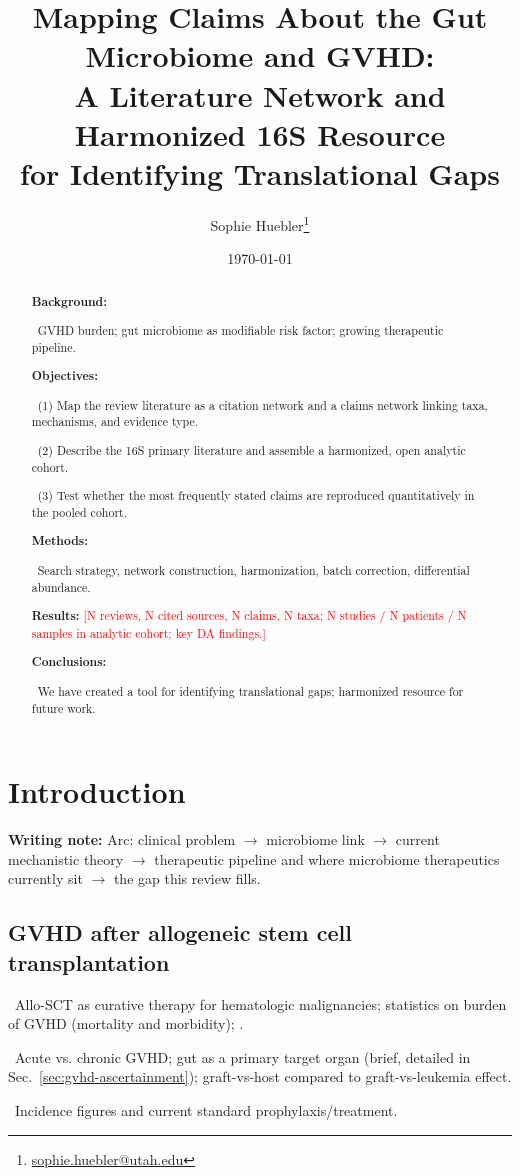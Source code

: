 \documentclass[11pt,a4paper]{article}
\newcommand{\todoitem}[1]{\par\noindent\textcolor{blue!70!black}{\textbullet~#1}}
\newcommand{\writingnote}[1]{\par\medskip\noindent\colorbox{yellow!30}{\parbox{\dimexpr\linewidth-2\fboxsep}{%
  \small\textbf{Writing note:} #1}}\par\medskip}
\newcommand{\ph}[1]{\textcolor{red}{[#1]}}  %
\begin{document}
\title{Mapping Claims About the Gut Microbiome and GVHD:\\
A Literature Network and Harmonized 16S Resource\\for Identifying Translational Gaps}
\author{Sophie Huebler\thanks{\href{mailto:sophie.huebler@utah.edu}{sophie.huebler@utah.edu}}}
\date{\today}
\maketitle


\begin{abstract}
\noindent\textbf{Background:}
\todoitem{GVHD burden; gut microbiome as modifiable risk factor; growing therapeutic pipeline.}

\noindent\textbf{Objectives:}
\todoitem{(1) Map the review literature as a citation network and a claims network linking taxa, mechanisms, and evidence type.}
\todoitem{(2) Describe the 16S primary literature and assemble a harmonized, open analytic cohort.}
\todoitem{(3) Test whether the most frequently stated claims are reproduced quantitatively in the pooled cohort.}

\noindent\textbf{Methods:}
\todoitem{Search strategy, network construction, harmonization, batch correction, differential abundance.}

\noindent\textbf{Results:}
\ph{N reviews, N cited sources, N claims, N taxa; N studies / N patients / N samples in analytic cohort; key DA findings.}

\noindent\textbf{Conclusions:}
\todoitem{We have created a tool for identifying translational gaps; harmonized resource for future work.}
\end{abstract}

\tableofcontents
\newpage


\section{Introduction}
\label{sec:introduction}

\writingnote{Arc: clinical problem $\to$ microbiome link $\to$ current mechanistic theory $\to$ therapeutic pipeline and where microbiome therapeutics currently sit $\to$ the gap this review fills. }

\subsection*{GVHD after allogeneic stem cell transplantation}
\label{par:intro-gvhd}
\todoitem{Allo-SCT as curative therapy for hematologic malignancies; statistics on burden of GVHD (mortality and morbidity); \cite{Gratwohl2010} \cite{Ferrara2009} \cite{Gooley2010} \cite{Singh2016}.}
\todoitem{Acute vs. chronic GVHD; gut as a primary target organ (brief, detailed in Sec.~\ref{sec:gvhd-ascertainment}); graft-vs-host compared to graft-vs-leukemia effect.}
\todoitem{Incidence figures and current standard prophylaxis/treatment.}
\end{document}
